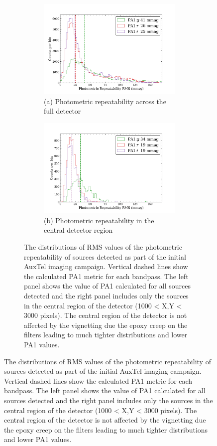 \begin{figure}[!ht]
\begin{figure}[!ht]
\begin{subfigure}{.5\textwidth}
    \centering
    \includegraphics[width=1.1\textwidth]{figures/pa1_auxtel}
     \caption[\small]{(a) Photometric repeatability across the full detector}
\end{subfigure}%
\begin{subfigure}{.5\textwidth} 
    \centering
    \includegraphics[width=1.1\textwidth]{figures/pa1_auxtel_central}
    \caption[\small]{(b) Photometric repeatability in the central detector region}
\end{subfigure}
\par\medskip %
\caption[short]{The distributions of RMS values of the photometric repeatability of sources detected as part of the initial AuxTel imaging campaign. Vertical dashed lines show the calculated PA1 metric for each bandpass. The left panel shows the value of PA1 calculated for all sources detected and the right panel includes only the sources in the central region of the detector (1000 < X,Y < 3000 pixels). The central region of the detector is not affected by the vignetting due the epoxy creep on the filters leading to much tighter distributions and lower PA1 values.}
\label{fig:faro_auxtel_metrics}
\end{figure}



\end{figure}
